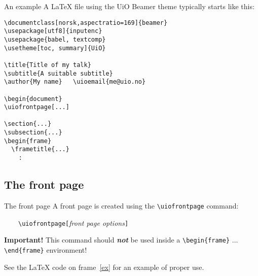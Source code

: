\documentclass[UKenglish,aspectratio=169]{beamer}
\newcommand{\Dots}{\ensuremath{\ldots}}
\newcommand{\p}[1]{\texttt{#1}}
\newcommand{\pcmd}[1]{\p{\textbackslash #1}}
\newcommand{\penv}[1]{\pcmd{begin}\ppar{#1} \Dots{} \pcmd{end}\ppar{#1}}
\newcommand{\ppar}[1]{\p{\{#1\}}}
\begin{document}
\begin{frame}[fragile,label=ex]{An example}
  A \LaTeX{} file using the UiO Beamer theme typically starts like
  this:

  \medskip
  \begin{Verbatim}[fontsize=\scriptsize]
\documentclass[norsk,aspectratio=169]{beamer}
\usepackage[utf8]{inputenc}
\usepackage{babel, textcomp}
\usetheme[toc, summary]{UiO}

\title{Title of my talk}
\subtitle{A suitable subtitle}
\author{My name}   \uioemail{me@uio.no}

\begin{document}
\uiofrontpage[...]

\section{...}
\subsection{...}
\begin{frame}
  \frametitle{...}
    :
  \end{Verbatim}
\end{frame}

\subsection{The front page}

\begin{frame}{The front page}
  A front page is created using the \pcmd{uiofrontpage} command:

  \medskip
  ~~~~\pcmd{uiofrontpage}\p{[}\emph{front page options}\p{]}

  \bigskip
  \begin{alert}{\textbf{Important!} }
    This command should \textbf{\emph{not}} be used inside a
    \penv{frame} environment! 
  \end{alert}

  \medskip
  See the \LaTeX{} code on frame~\ref{ex} for an example of proper
  use.
\end{frame}
  
\end{document}
